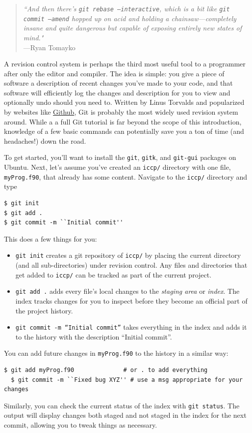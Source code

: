 \label{chap:Revision control}

\begin{quote}
\emph{``And then there's \texttt{git rebase --interactive}, which is a bit like \texttt{git commit --amend} hopped up on acid and holding a chainsaw---completely insane and quite dangerous but capable of exposing entirely new states of mind."} \\ \hspace*{\fill}---Ryan Tomayko
\end{quote}

A revision control system is perhaps the third most useful tool to a programmer after only the editor and compiler.
The idea is simple: you give a piece of software a description of recent changes you've made to your code, and that software will efficiently log the changes and description for you to view and optionally undo should you need to.
Written by Linus Torvalds and popularized by websites like \href{https://Github.com/}{Github}, Git is probably the most widely used revision system around.
While a a full Git tutorial is far beyond the scope of this introduction, knowledge of a few basic commands can potentially save you a ton of time (and headaches!) down the road.

To get started, you'll want to install the \texttt{git}, \texttt{gitk}, and \texttt{git-gui} packages on Ubuntu. Next, let's assume you've created an \texttt{iccp/} directory with one file, \texttt{myProg.f90}, that already has some content. Navigate to the \texttt{iccp/} directory and type
\begin{verbatim}
$ git init
$ git add .
$ git commit -m ``Initial commit''
\end{verbatim}
This does a few things for you:
\begin{itemize}
  \item \texttt{git init} creates a git repository of \texttt{iccp/} by placing the current directory (and all sub-directories) under revision control.
    Any files and directories that get added to \texttt{iccp/} can be tracked as part of the current project.
  \item \texttt{git add .} adds every file's local changes to the \emph{staging area} or \emph{index}.
    The index tracks changes for you to inspect before they become an official part of the project history.
  \item \texttt{git commit -m ``Initial commit''} takes everything in the index and adds it to the history with the description ``Initial commit''.
\end{itemize}
You can add future changes in \texttt{myProg.f90} to the history in a similar way:
\begin{lstlisting}[style=prompt,nolol]
  $ git add myProg.f90              # or . to add everything
  $ git commit -m ``Fixed bug XYZ'' # use a msg appropriate for your changes
\end{lstlisting}
Similarly, you can check the current status of the index with \texttt{git status}. 
The output will display changes both staged and not staged in the index for the next commit, allowing you to tweak things as necessary.

